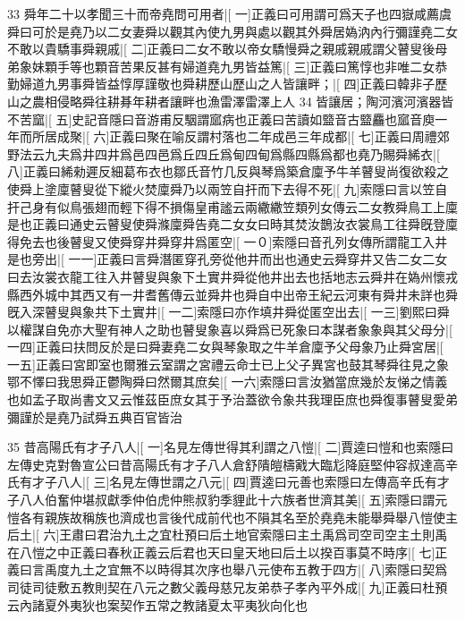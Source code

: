33
舜年二十以孝聞三十而帝堯問可用者|[%
一]正義曰可用謂可爲天子也四嶽咸薦虞舜曰可於是堯乃以二女妻舜以觀其內使九男與處以觀其外舜居媯汭內行彌謹堯二女不敢以貴驕事舜親戚|[%
二]正義曰二女不敢以帝女驕慢舜之親戚親戚謂父瞽叟後母弟象妹顆手等也顆音苦果反甚有婦道堯九男皆益篤|[%
三]正義曰篤惇也非唯二女恭勤婦道九男事舜皆益惇厚謹敬也舜耕歷山歷山之人皆讓畔；|[%
四]正義曰韓非子歷山之農相侵略舜往耕朞年耕者讓畔也漁雷澤雷澤上人
34
皆讓居；陶河濱河濱器皆不苦窳|[%
五]史記音隱曰音游甫反駰謂寙病也正義曰苦讀如盬音古盬麤也寙音庾一年而所居成聚|[%
六]正義曰聚在喻反謂村落也二年成邑三年成都|[%
七]正義曰周禮郊野法云九夫爲井四井爲邑四邑爲丘四丘爲甸四甸爲縣四縣爲都也堯乃賜舜絺衣|[%
八]正義曰絺勑遲反細葛布衣也鄒氏音竹几反與琴爲築倉廩予牛羊瞽叟尚復欲殺之使舜上塗廩瞽叟從下縱火焚廩舜乃以兩笠自扞而下去得不死|[%
九]索隱曰言以笠自扞己身有似鳥張翅而輕下得不損傷皇甫謐云兩繖繖笠類列女傳云二女教舜鳥工上廩是也正義曰通史云瞽叟使舜滌廩舜告堯二女女曰時其焚汝鵲汝衣裳鳥工往舜旣登廩得免去也後瞽叟又使舜穿井舜穿井爲匿空|[%
一０]索隱曰音孔列女傳所謂龍工入井是也旁出|[%
一一]正義曰言舜潛匿穿孔旁從他井而出也通史云舜穿井又告二女二女曰去汝裳衣龍工往入井瞽叟與象下土實井舜從他井出去也括地志云舜井在媯州懷戎縣西外城中其西又有一井耆舊傳云並舜井也舜自中出帝王紀云河東有舜井未詳也舜旣入深瞽叟與象共下土實井|[%
一二]索隱曰亦作填井舜從匿空出去|[%
一三]劉熙曰舜以權謀自免亦大聖有神人之助也瞽叟象喜以舜爲已死象曰本謀者象象與其父母分|[%
一四]正義曰扶問反於是曰舜妻堯二女與琴象取之牛羊倉廩予父母象乃止舜宮居|[%
一五]正義曰宮即室也爾雅云室謂之宮禮云命士已上父子異宮也鼓其琴舜往見之象鄂不懌曰我思舜正鬱陶舜曰然爾其庶矣|[%
一六]索隱曰言汝猶當庶幾於友悌之情義也如孟子取尚書文又云惟茲臣庶女其于予治蓋欲令象共我理臣庶也舜復事瞽叟愛弟彌謹於是堯乃試舜五典百官皆治

35
昔高陽氏有才子八人|[%
一]名見左傳世得其利謂之八愷|[%
二]賈逵曰愷和也索隱曰左傳史克對魯宣公曰昔高陽氏有才子八人倉舒隤皚檮戭大臨尨降庭堅仲容叔達高辛氏有才子八人|[%
三]名見左傳世謂之八元|[%
四]賈逵曰元善也索隱曰左傳高辛氏有才子八人伯奮仲堪叔獻季仲伯虎仲熊叔豹季貍此十六族者世濟其美|[%
五]索隱曰謂元愷各有親族故稱族也濟成也言後代成前代也不隕其名至於堯堯未能舉舜舉八愷使主后土|[%
六]王肅曰君治九土之宜杜預曰后土地官索隱曰主土禹爲司空司空主土則禹在八愷之中正義曰春秋正義云后君也天曰皇天地曰后土以揆百事莫不時序|[%
七]正義曰言禹度九土之宜無不以時得其次序也舉八元使布五教于四方|[%
八]索隱曰契爲司徒司徒敷五教則契在八元之數父義母慈兄友弟恭子孝內平外成|[%
九]正義曰杜預云內諸夏外夷狄也案契作五常之教諸夏太平夷狄向化也

